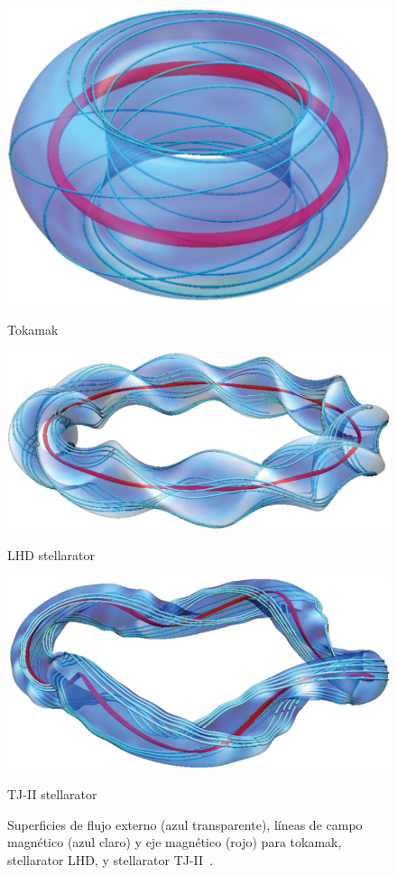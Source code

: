 \begin{figure}[H]
    \centering
            \includegraphics[width=\linewidth]{img/twist_1.png}
            \caption{Tokamak}
        \endminipage\hfill
            \includegraphics[width=\linewidth]{img/twist_2.png}
            \caption{LHD stellarator}
        \endminipage\hfill
            \includegraphics[width=\linewidth]{img/twist_3.png}
            \caption{TJ-II stellarator}
        \endminipage
    \caption[Superficies de flujo externo, líneas de campo magnético y eje magnético para tokamak, stellarator LHD, y stellarator TJ-II]{Superficies de flujo externo (azul transparente), líneas de campo magnético (azul claro) y eje magnético
    (rojo) para tokamak, stellarator LHD, y stellarator TJ-II~\cite{doi:10.1063/1.4921255}.}
    \label{fig:twist}
\end{figure}

